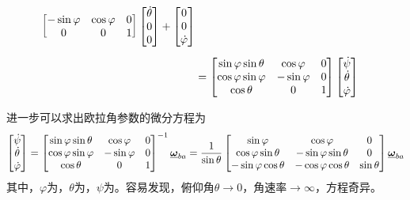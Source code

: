 \begin{align}
\begin{bmatrix}
		- \sin \varphi & \cos \varphi & 0 \\
		0 & 0 & 1
	\end{bmatrix}
	\begin{bmatrix}
		\dot{\theta} \\
		0 \\
		0
	\end{bmatrix}
	+
	\begin{bmatrix}
		0 \\
		0 \\
		\dot{\varphi}
	\end{bmatrix} \notag \\[0.5em]
	&=
	\begin{bmatrix}
		\sin \varphi \sin \theta & \cos \varphi & 0 \\
		\cos \varphi \sin \varphi & -\sin \varphi & 0\\
		\cos \theta & 0 & 1
	\end{bmatrix}
	\begin{bmatrix}
		\dot{\psi} \\
		\dot{\theta} \\
		\dot{\varphi}
	\end{bmatrix}
\end{align}

进一步可以求出欧拉角参数的微分方程为
\begin{equation}
	\begin{bmatrix}
		\dot{\psi} \\
		\dot{\theta} \\
		\dot{\varphi}
	\end{bmatrix}
	=
	\begin{bmatrix}
		\sin \varphi \sin \theta & \cos \varphi & 0 \\
		\cos \varphi \sin \varphi & -\sin \varphi & 0\\
		\cos \theta & 0 & 1
	\end{bmatrix}^{-1}
	\underline{\bm{\omega}}_{ba} 
	=
	\dfrac{1}{\sin \theta}
	\begin{bmatrix}
		\sin \varphi & \cos \varphi & 0 \\
		\cos \varphi \sin \theta & - \sin \varphi \sin \theta & 0 \\
		- \sin \varphi \cos \theta & - \cos \varphi \cos \theta & \sin \theta
	\end{bmatrix}
	\underline{\bm{\omega}}_{ba}
\end{equation}
其中，$\varphi$为，$\theta$为，$\psi$为。容易发现，俯仰角$\theta \to 0$，角速率$\to \infty$，方程奇异。
\vspace*{1em}


